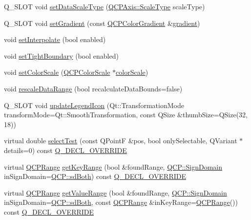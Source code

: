 \begin{DoxyCompactItemize}
\item 
Q\+\_\+\+S\+L\+OT void \hyperlink{class_q_c_p_color_map_a9d20aa08e3c1f20f22908c45b9c06511}{set\+Data\+Scale\+Type} (\hyperlink{class_q_c_p_axis_a36d8e8658dbaa179bf2aeb973db2d6f0}{Q\+C\+P\+Axis\+::\+Scale\+Type} scale\+Type)
\item 
Q\+\_\+\+S\+L\+OT void \hyperlink{class_q_c_p_color_map_a7313c78360471cead3576341a2c50377}{set\+Gradient} (const \hyperlink{class_q_c_p_color_gradient}{Q\+C\+P\+Color\+Gradient} \&\hyperlink{class_q_c_p_color_map_acc4bb87c903607b96c08d2bc34bc24cd}{gradient})
\item 
void \hyperlink{class_q_c_p_color_map_a484eaa8a5065cfc386b15375bf98b964}{set\+Interpolate} (bool enabled)
\item 
void \hyperlink{class_q_c_p_color_map_ad03221cc285e5f562a0b13d684b5576d}{set\+Tight\+Boundary} (bool enabled)
\item 
void \hyperlink{class_q_c_p_color_map_aa828921db364fe3c6af4619580ab85fd}{set\+Color\+Scale} (\hyperlink{class_q_c_p_color_scale}{Q\+C\+P\+Color\+Scale} $\ast$\hyperlink{class_q_c_p_color_map_a9d37d08c467ac645b86fc71a3b151208}{color\+Scale})
\item 
void \hyperlink{class_q_c_p_color_map_a856608fa3dd1cc290bcd5f29a5575774}{rescale\+Data\+Range} (bool recalculate\+Data\+Bounds=false)
\item 
Q\+\_\+\+S\+L\+OT void \hyperlink{class_q_c_p_color_map_a5d8158b62d55fcfeaabcb68ce0083e87}{update\+Legend\+Icon} (Qt\+::\+Transformation\+Mode transform\+Mode=Qt\+::\+Smooth\+Transformation, const Q\+Size \&thumb\+Size=Q\+Size(32, 18))
\item 
virtual double \hyperlink{class_q_c_p_color_map_afb4b843596addf58096082827a9e3450}{select\+Test} (const Q\+PointF \&pos, bool only\+Selectable, Q\+Variant $\ast$details=0) const \hyperlink{qcustomplot_8h_a42cc5eaeb25b85f8b52d2a4b94c56f55}{Q\+\_\+\+D\+E\+C\+L\+\_\+\+O\+V\+E\+R\+R\+I\+DE}
\item 
virtual \hyperlink{class_q_c_p_range}{Q\+C\+P\+Range} \hyperlink{class_q_c_p_color_map_a985861974560f950af6cb7fae8c46267}{get\+Key\+Range} (bool \&found\+Range, \hyperlink{namespace_q_c_p_afd50e7cf431af385614987d8553ff8a9}{Q\+C\+P\+::\+Sign\+Domain} in\+Sign\+Domain=\hyperlink{namespace_q_c_p_afd50e7cf431af385614987d8553ff8a9aa38352ef02d51ddfa4399d9551566e24}{Q\+C\+P\+::sd\+Both}) const \hyperlink{qcustomplot_8h_a42cc5eaeb25b85f8b52d2a4b94c56f55}{Q\+\_\+\+D\+E\+C\+L\+\_\+\+O\+V\+E\+R\+R\+I\+DE}
\item 
virtual \hyperlink{class_q_c_p_range}{Q\+C\+P\+Range} \hyperlink{class_q_c_p_color_map_a88134493aaf6b297af34eaab65264fff}{get\+Value\+Range} (bool \&found\+Range, \hyperlink{namespace_q_c_p_afd50e7cf431af385614987d8553ff8a9}{Q\+C\+P\+::\+Sign\+Domain} in\+Sign\+Domain=\hyperlink{namespace_q_c_p_afd50e7cf431af385614987d8553ff8a9aa38352ef02d51ddfa4399d9551566e24}{Q\+C\+P\+::sd\+Both}, const \hyperlink{class_q_c_p_range}{Q\+C\+P\+Range} \&in\+Key\+Range=\hyperlink{class_q_c_p_range}{Q\+C\+P\+Range}()) const \hyperlink{qcustomplot_8h_a42cc5eaeb25b85f8b52d2a4b94c56f55}{Q\+\_\+\+D\+E\+C\+L\+\_\+\+O\+V\+E\+R\+R\+I\+DE}
\end{DoxyCompactItemize}
